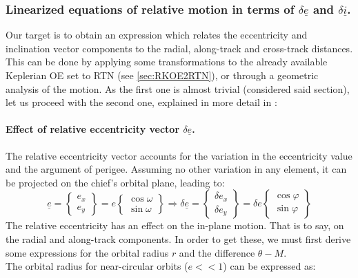 		\subsubsection{Linearized equations of relative motion in terms of $\delta\underline{e}$ and $\delta\underline{i}$.}
		\indent Our target is to obtain an expression which relates the eccentricity and inclination vector components to the radial, along-track and cross-track distances. This can be done by applying some transformations to the already available Keplerian OE set to RTN (see \ref{sec:RKOE2RTN}), or through a geometric analysis of the motion. As the first one is almost trivial (considered said section), let us proceed with the second one, explained in more detail in \cite{DAmico_Montenbruck}:\\
			\paragraph{ Effect of relative eccentricity vector $\delta \underline{e}$. \\}
			\indent The relative eccentricity vector accounts for the variation in the eccentricity value and the argument of perigee. Assuming no other variation in any element, it can be projected on the chief's orbital plane, leading to:
			\[
			\underline{e} = \left\{ 
			\begin{array}{c}
			 e_x \\[1.5em]
			 e_y
			\end{array}\right\} 
			 = e \left\{\begin{array}{c}
			 \cos\omega \\[1.5em]
			 \sin\omega 
			\end{array}\right\} 
			\Rightarrow
			\delta \underline{e} = 
			\left\{ 
			\begin{array}{c}
			\delta e_x \\[1.5em]
			\delta e_y
			\end{array}
			\right\} = \delta e
			\left\{ 
			\begin{array}{c}
			\cos\varphi \\[1.5em]
			\sin\varphi
			\end{array}
			\right\}
			\]
			\indent The relative eccentricity has an effect on the in-plane motion. That is to say, on the radial and along-track components. In order to get these, we must first derive some expressions for the orbital radius $r$ and the difference $\theta - M$. \\
			\indent The orbital radius for near-circular orbits ($e<<1$) can be expressed as:
